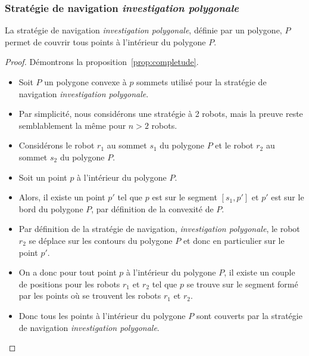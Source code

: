 \documentclass[english,RandD]{rapportPFE}  %
\begin{document}
			\subsubsection*{Stratégie de navigation \textit{investigation polygonale}}
				\begin{Proposition}
					La stratégie de navigation \textit{investigation polygonale}, définie par un polygone, $P$ permet de couvrir tous points à l'intérieur du polygone $P$.
					\label{prop:completude}
				\end{Proposition}
				\begin{proof}
					Démontrons la proposition~\ref{prop:completude}.
					\begin{itemize}
						\item Soit $P$ un polygone convexe à $p$ sommets utilisé pour la stratégie de navigation \textit{investigation polygonale}.
						\item Par simplicité, nous considérons une stratégie à 2 robots, mais la preuve reste semblablement la même pour $n > 2$ robots.
						\item Considérons le robot $r_1$ au sommet $s_1$ du polygone $P$ et le robot $r_2$ au sommet $s_2$ du polygone $P$.
						\item Soit un point $p$ à l'intérieur du polygone $P$.
						\item Alors, il existe un point $p'$ tel que $p$ est sur le segment $[s_1, p']$ et $p'$ est sur le bord du polygone $P$, par définition de la convexité de $P$.
						\item Par définition de la stratégie de navigation, \textit{investigation polygonale}, le robot $r_2$ se déplace sur les contours du polygone $P$ et donc en particulier sur le point $p'$.
						\item On a donc pour tout point $p$ à l'intérieur du polygone $P$, il existe un couple de positions pour les robots $r_1$ et $r_2$ tel que $p$ se trouve sur le segment formé par les points où se trouvent les robots $r_1$ et $r_2$.
						\item Donc tous les points à l'intérieur du polygone $P$ sont couverts par la stratégie de navigation \textit{investigation polygonale}.
					\end{itemize}
				\end{proof}
\end{document}
